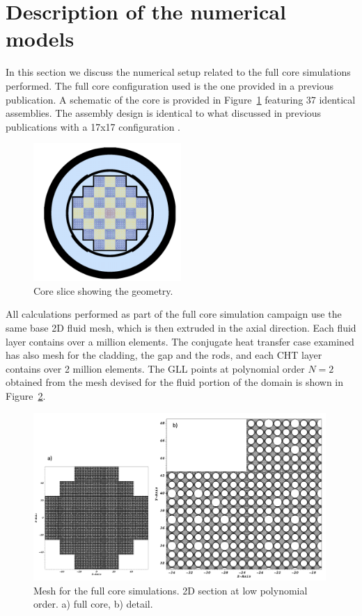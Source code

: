 \section{Description of the numerical models}
\label{sec:model}

In this section we discuss the numerical setup related to the full core simulations performed.
The full core configuration used is the one provided in a previous publication. A schematic of the core is provided in Figure~\ref{fig:core} featuring 37 identical assemblies. The assembly design is identical to what discussed in previous publications with a 17x17 configuration
\cite{merzari2020wall}.

\begin{figure}[!ht]
\centering
\includegraphics[width=0.5\textwidth]{./figures/core_slice.png}
\caption{Core slice showing the geometry.}
\label{fig:core}
\end{figure}

All calculations performed as part of the full core simulation campaign use the same base 2D fluid mesh, which is then extruded in the axial direction. Each fluid layer contains over a million elements. The conjugate heat transfer case examined has also mesh for the cladding, the gap and the rods, and each CHT layer contains over 2 million elements. The GLL points at polynomial order $N=2$ obtained from the mesh devised for the fluid portion of the domain is shown in Figure~\ref{fig:mesh1}.

\begin{figure}[!ht]
\centering
\includegraphics[width=0.99\textwidth]{./figures/full_core_mesh.png}
\caption{Mesh for the full core simulations. 2D section at low polynomial order. a) full core, b) detail.}
\label{fig:mesh1}
\end{figure}

